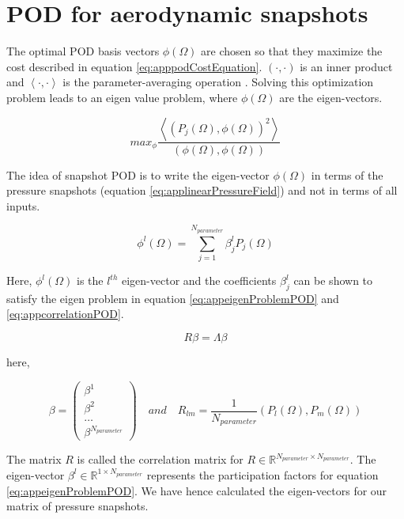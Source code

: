 \section{POD for aerodynamic snapshots}
The optimal POD basis vectors \(\phi(\Omega)\) are chosen so that they maximize the cost described in equation \ref{eq:apppodCostEquation}. \( (\cdot, \cdot) \) is an inner product and \(\left \langle \cdot, \cdot \right \rangle\) is the parameter-averaging operation \cite{berkooz1993proper, epureanuj1999reduced}. Solving this optimization problem leads to an eigen value problem, where \(\phi(\Omega)\) are the eigen-vectors.

\begin{equation}\label{eq:apppodCostEquation}
max_{\phi}\frac{\left \langle (P_{j}(\Omega), \phi(\Omega))^2 \right \rangle}{(\phi(\Omega), \phi(\Omega))}
\end{equation}

The idea of snapshot POD is to write the eigen-vector \(\phi(\Omega)\) in terms of the pressure snapshots (equation \ref{eq:applinearPressureField}) and not in terms of all inputs. 

\begin{equation}\label{eq:applinearPressureField}
\phi^{l}(\Omega) = \sum_{j=1}^{N_{parameter}}\beta_{j}^{l}P_{j}(\Omega)
\end{equation}  

Here, \(\phi^{l}(\Omega)\) is the \(l^{th}\) eigen-vector and the coefficients \(\beta_{j}^{l}\) can be shown to satisfy the eigen problem in equation \ref{eq:appeigenProblemPOD} and \ref{eq:appcorrelationPOD}. 

\begin{equation}\label{eq:appeigenProblemPOD}
R\beta = \Lambda\beta
\end{equation}  

here, 

\begin{equation}\label{eq:appcorrelationPOD}
 \beta =  \begin{pmatrix}
\beta^{1}
\\\beta^{2}\
\\\ldots\ 
\\\beta^{N_{parameter}}
\end{pmatrix} 
\quad 
and 
\quad 
R_{lm} = \frac{1}{N_{parameter}}( P_{l}(\Omega) , P_{m}(\Omega))
\end{equation} 

The matrix \(R\) is called the correlation matrix for \(R \in \mathbb{R}^{N_{parameter} \times N_{parameter}}\). The eigen-vector \(\beta^{l} \in \mathbb{R}^{1 \times N_{parameter}}\) represents the participation factors for equation \ref{eq:appeigenProblemPOD}. We have hence calculated the eigen-vectors for our matrix of pressure snapshots.

